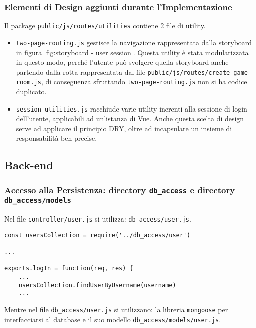 \newpage

\subsubsection{Elementi di Design aggiunti durante l'Implementazione}

Il package \texttt{public/js/routes/utilities} contiene 2 file di utility.
\begin{itemize}
\item
	\texttt{two-page-routing.js} gestisce la navigazione rappresentata dalla storyboard in figura \ref{fig:storyboard - user session}. Questa utility è stata modularizzata in questo modo, perché l'utente può svolgere quella storyboard anche partendo dalla rotta rappresentata dal file \texttt{public/js/routes/create-game-room.js}, di conseguenza sfruttando \texttt{two-page-routing.js} non si ha codice duplicato.
\item
	\texttt{session-utilities.js} racchiude varie utility inerenti alla sessione di login dell'utente, applicabili ad un'istanza di Vue. Anche questa scelta di design serve ad applicare il principio DRY, oltre ad incapsulare un insieme di responsabilità ben precise.
\end{itemize}

\subsection{Back-end}

\subsubsection{Accesso alla Persistenza: directory \texttt{db\_access} e directory \texttt{db\_access/models}}
\label{persistenza: db_access - Codice}

Nel file \texttt{controller/user.js} si utilizza: \texttt{db\_access/user.js}.

\begin{lstlisting}
const usersCollection = require('../db_access/user')

...

exports.logIn = function(req, res) {
	...
	usersCollection.findUserByUsername(username)
	...
\end{lstlisting}

\removeHorizontalSpaceBig Mentre nel file \texttt{db\_access/user.js} si utilizzano: la libreria \texttt{mongoose} per interfacciarsi al database e il suo modello \texttt{db\_access/models/user.js}.

